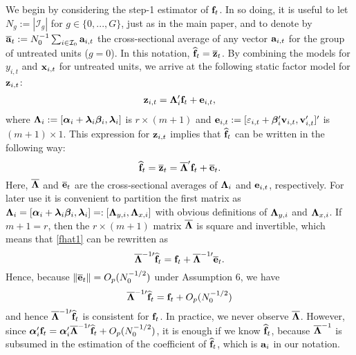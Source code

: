 \documentclass[12pt,fleqn]{article}
\begin{document}
\noindent We begin by considering the step-1 estimator of $\mathbf{f}_t$. In so doing, it is useful to let $N_g := |\mathcal{I}_{g}|$ for $g\in \{0,...,G\}$, just as in the main paper, and to denote by $\overline{\mathbf{a}}_t := N_0^{-1}\sum_{i \in \mathcal{I}_0} \mathbf{a}_{i,t}$ the cross-sectional average of any vector $\mathbf{a}_{i,t}$ for the group of untreated units ($g= 0$). In this notation, $\widehat{\mathbf{f}}_t = \overline {\mathbf{z}}_t$. By combining the models for $y_{i,t}$ and $\mathbf{x}_{i,t}$ for untreated units, we arrive at the following static factor model for $\mathbf{z}_{i,t}$:
\begin{align}
\mathbf{z}_{i,t} = \boldsymbol{\Lambda}_i'\mathbf{f}_t + \mathbf{e}_{i,t},
\end{align}
where $\boldsymbol{\Lambda}_i := [\boldsymbol{\alpha}_i +\boldsymbol{\lambda}_i\boldsymbol{\beta}_i, \boldsymbol{\lambda}_i]$ is $r\times (m+1)$ and $\mathbf{e}_{i,t} := [\varepsilon_{i,t} + \boldsymbol{\beta}_i'\mathbf{v}_{i,t}, \mathbf{v}_{i,t}']'$ is $(m+1)\times 1$. This expression for $\mathbf{z}_{i,t}$ implies that $\widehat{\mathbf{f}}_t$ can be written in the following way:
\begin{equation}\label{fhat1}
\widehat{\mathbf{f}}_t = \overline {\mathbf{z}}_t = \overline{\boldsymbol{\Lambda}}'\mathbf{f}_t + \overline {\mathbf{e}}_{t}.
\end{equation}
Here, $\overline{\boldsymbol{\Lambda}}$ and $\overline {\mathbf{e}}_{t}$ are the cross-sectional averages of $\boldsymbol{\Lambda}_i$ and $\mathbf{e}_{i,t}$, respectively. For later use it is convenient to partition the first matrix as $\boldsymbol{\Lambda}_i = [\boldsymbol{\alpha}_i +\boldsymbol{\lambda}_i\boldsymbol{\beta}_i, \boldsymbol{\lambda}_i] =: [\boldsymbol{\Lambda}_{y,i}, \boldsymbol{\Lambda}_{x,i}]$ with obvious definitions of $\boldsymbol{\Lambda}_{y,i}$ and $\boldsymbol{\Lambda}_{x,i}$. If $m+1=r$, then the $r\times (m+1)$ matrix $\overline{\boldsymbol{\Lambda}}$ is square and invertible, which means that \eqref{fhat1} can be rewritten as
\begin{equation}\label{redefined}
    \overline{\boldsymbol{\Lambda}}^{-1\prime}\widehat{\mathbf{f}}_t=\mathbf{f}_t+\overline{\boldsymbol{\Lambda}}^{-1\prime}\overline{\mathbf{e}}_t .
\end{equation}
Hence, because $\|\overline{\mathbf{e}}_t\|=O_p(N_0^{-1/2})$ under Assumption 6, we have
\begin{equation}\label{redefined2}
\overline{\boldsymbol{\Lambda}}^{-1\prime}\widehat{\mathbf{f}}_t = \mathbf{f}_t + O_p(N_0^{-1/2})
\end{equation}
and hence $\overline{\boldsymbol{\Lambda}}^{-1\prime} \widehat{\mathbf{f}}_t$ is consistent for $\mathbf{f}_t$. In practice, we never observe $\overline{\boldsymbol{\Lambda}}$. However, since $\boldsymbol{\alpha}_i'\mathbf{f}_t = \boldsymbol{\alpha}_i' \overline{\boldsymbol{\Lambda}}^{-1\prime}\widehat{\mathbf{f}}_t + O_p(N_0^{-1/2})$, it is enough if we know $\widehat{\mathbf{f}}_t$, because $\overline{\boldsymbol{\Lambda}}^{-1}$ is subsumed in the estimation of the coefficient of $\widehat{\mathbf{f}}_t$, which is $\mathbf{a}_i$ in our notation.
\end{document}
